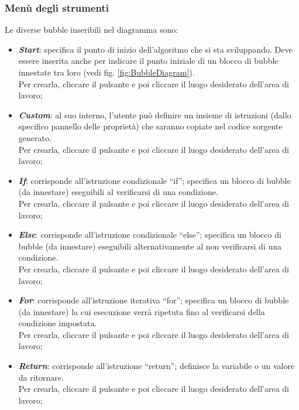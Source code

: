 \documentclass[../ManualeUtente.tex]{subfiles}
\begin{document}
			\subsubsection{Menù degli strumenti}\label{sez:BubbleDiagram-strumenti}
				Le diverse bubble inseribili nel diagramma sono:
				\begin{itemize}
					\item \textit{\textbf{Start}}: specifica il punto di inizio dell'algoritmo che si sta
					sviluppando. Deve essere inserita anche per indicare il punto iniziale di un blocco di bubble
					innestate tra loro (vedi fig. \ref{fig:BubbleDiagram}).\\
					Per crearla, cliccare il pulsante e poi cliccare il luogo desiderato
					dell'area di lavoro;
					\item \textit{\textbf{Custom}}: al suo interno, l'utente può definire un insieme di istruzioni
					(dallo specifico pannello delle proprietà) che saranno copiate nel codice sorgente generato.\\
					Per crearla, cliccare il pulsante e poi cliccare il luogo desiderato
					dell'area di lavoro;
					\item \textit{\textbf{If}}: corrisponde all'istruzione condizionale ``if''; specifica un blocco
					di bubble (da innestare) eseguibili al verificarsi di una condizione.\\
					Per crearla, cliccare il pulsante e poi cliccare il luogo desiderato
					dell'area di lavoro;
					\item \textit{\textbf{Else}}: corrisponde all'istruzione condizionale ``else''; specifica un
					blocco di bubble (da innestare) eseguibili alternativamente al non	verificarsi di una
					condizione.\\
					Per crearla, cliccare il pulsante e poi cliccare il luogo desiderato
					dell'area di lavoro;
					\item \textit{\textbf{For}}: corrisponde all'istruzione iterativa ``for''; specifica un
					blocco di bubble (da innestare) la cui esecuzione verrà ripetuta fino al verificarsi della
					condizione impostata.\\
					Per crearla, cliccare il pulsante e poi cliccare il luogo desiderato
					dell'area di lavoro;
					\item \textit{\textbf{Return}}: corrisponde all'istruzione ``return''; definisce la variabile
					o un valore da ritornare.\\
					Per crearla, cliccare il pulsante e poi cliccare il luogo desiderato
					dell'area di lavoro;

\end{itemize}
\end{document}
